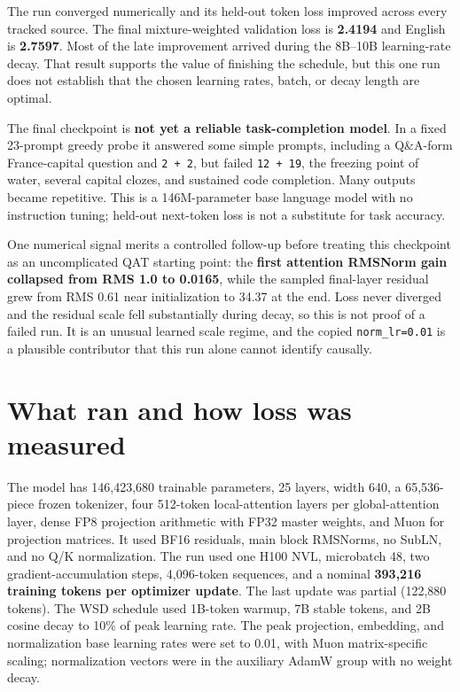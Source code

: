 \documentclass[10pt,a4paper]{article}
\begin{document}
The run converged numerically and its held-out token loss improved
across every tracked source. The final mixture-weighted validation loss
is \textbf{2.4194} and English is \textbf{2.7597}. Most of the late
improvement arrived during the 8B--10B learning-rate decay. That result
supports the value of finishing the schedule, but this one run does not
establish that the chosen learning rates, batch, or decay length are
optimal.

The final checkpoint is \textbf{not yet a reliable task-completion
model}. In a fixed 23-prompt greedy probe it answered some simple
prompts, including a Q\&A-form France-capital question and
\texttt{2\ +\ 2}, but failed \texttt{12\ +\ 19}, the freezing point of
water, several capital clozes, and sustained code completion. Many
outputs became repetitive. This is a 146M-parameter base language model
with no instruction tuning; held-out next-token loss is not a substitute
for task accuracy.

One numerical signal merits a controlled follow-up before treating this
checkpoint as an uncomplicated QAT starting point: the \textbf{first
attention RMSNorm gain collapsed from RMS 1.0 to 0.0165}, while the
sampled final-layer residual grew from RMS 0.61 near initialization to
34.37 at the end. Loss never diverged and the residual scale fell
substantially during decay, so this is not proof of a failed run. It is
an unusual learned scale regime, and the copied \texttt{norm\_lr=0.01}
is a plausible contributor that this run alone cannot identify causally.

\section{What ran and how loss was
measured}\label{what-ran-and-how-loss-was-measured}

The model has 146,423,680 trainable parameters, 25 layers, width 640, a
65,536-piece frozen tokenizer, four 512-token local-attention layers per
global-attention layer, dense FP8 projection arithmetic with FP32 master
weights, and Muon for projection matrices. It used BF16 residuals, main
block RMSNorms, no SubLN, and no Q/K normalization. The run used one
H100 NVL, microbatch 48, two gradient-accumulation steps, 4,096-token
sequences, and a nominal \textbf{393,216 training tokens per optimizer
update}. The last update was partial (122,880 tokens). The WSD schedule
used 1B-token warmup, 7B stable tokens, and 2B cosine decay to 10\% of
peak learning rate. The peak projection, embedding, and normalization
base learning rates were set to 0.01, with Muon matrix-specific scaling;
normalization vectors were in the auxiliary AdamW group with no weight
decay.
\end{document}
